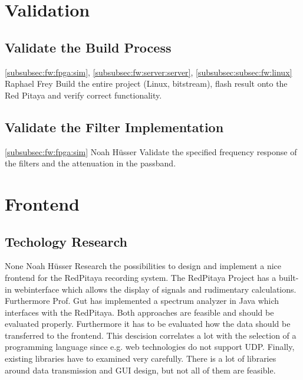 \documentclass[a4paper,oneside]{alpenspecs/alpenspecs}
\begin{document}
\section{Validation}
\label{sec:validation}

\subsection{Validate the Build Process}
\label{subsec:validation:build}
\wpac
    {}
    {}
    {}
    {\ref{subsubsec:fw:fpga:sim}, \ref{subsubsec:fw:server:server}, \ref{subsubsec:subsec:fw:linux}}
    {}
    {Raphael Frey}
    {%
        Build the entire project (Linux, bitstream), flash
        result onto the Red Pitaya and verify correct functionality.
    }

\subsection{Validate the Filter Implementation}
\label{subsec:validation:impl}
\wpac
    {}
    {}
    {}
    {\ref{subsubsec:fw:fpga:sim}}
    {}
    {Noah Hüsser}
    {%
        Validate the specified frequency response of the filters and the attenuation in the passband.
    }

\section{Frontend}
\label{sec:frontend}

\subsection{Techology Research}
\label{subsec:frontend:research}
\wpac
    {}
    {}
    {}
    {None}
    {}
    {Noah Hüsser}
    {%
        Research the possibilities to design and implement a nice frontend for the RedPitaya recording system.
        The RedPitaya Project has a built-in webinterface which allows the display of signals and rudimentary calculations.
        Furthermore Prof. Gut has implemented a spectrum analyzer in Java which interfaces with the RedPitaya.
        Both approaches are feasible and should be evaluated properly.
        Furthermore it has to be evaluated how the data should be transferred to the frontend.
        This descision correlates a lot with the selection of a programming language since e.g. web technologies do not support UDP.
        Finally, existing libraries have to examined very carefully. There is a lot of libraries around data transmission and GUI design, but not all of them are feasible.
    }
\end{document}
